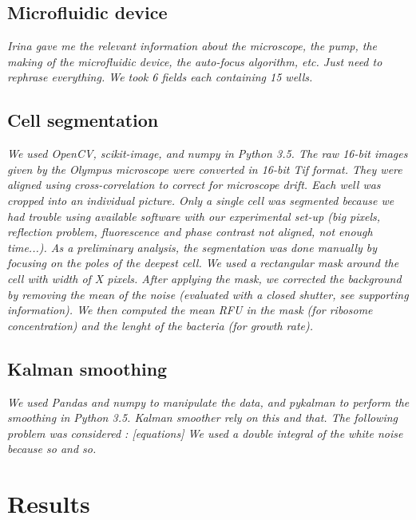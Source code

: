 \subsection{Microfluidic device}

\textit{Irina gave me the relevant information about the microscope, the pump, the making of the microfluidic device, the auto-focus algorithm, etc.
Just need to rephrase everything.
We took 6 fields each containing 15 wells.}

\subsection{Cell segmentation}

\textit{We used OpenCV, scikit-image, and numpy in Python 3.5.
The raw 16-bit images given by the Olympus microscope were converted in 16-bit Tif format.
They were aligned using cross-correlation to correct for microscope drift.
Each well was cropped into an individual picture.
Only a single cell was segmented because we had trouble using available software with our experimental set-up (big pixels, reflection problem, fluorescence and phase contrast not aligned, not enough time...).
As a preliminary analysis, the segmentation was done manually by focusing on the poles of the deepest cell.
We used a rectangular mask around the cell with width of X pixels.
After applying the mask, we corrected the background by removing the mean of the noise (evaluated with a closed shutter, see supporting information).
We then computed the mean RFU in the mask (for ribosome concentration) and the lenght of the bacteria (for growth rate).
}

\subsection{Kalman smoothing}

\textit{We used Pandas and numpy to manipulate the data, and pykalman to perform the smoothing in Python 3.5.
Kalman smoother rely on this and that.
The following problem was considered :
[equations]
We used a double integral of the white noise because so and so.
}

\section{Results}

